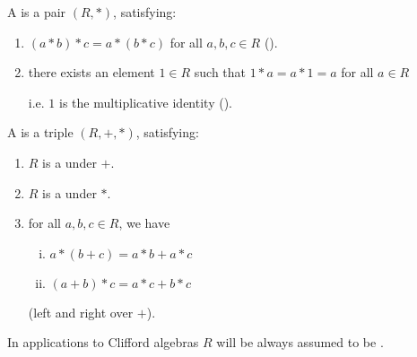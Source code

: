 \begin{definition}[Monoid]
    \label{Monoid}
    \leanok

    A  is a pair $(R, *)$, satisfying:

    \begin{enumerate}
    \item $(a * b) * c = a * (b * c)$ for all $a, b, c \in R$ ().

    \item there exists an element $1 \in R$ such that $1 * a = a * 1 = a$ for all $a \in R$
    
    i.e. $1$ is the multiplicative identity ().

    \end{enumerate}

\end{definition}

\begin{definition}[Ring]
    \label{Ring}
    \leanok

    A  is a triple $(R, +, *)$, satisfying:

    \begin{enumerate}

    \item $R$ is a  under $+$.

    \item $R$ is a  under $*$.

    \item for all $a, b, c \in R$, we have
    
    \begin{enumerate}[(i)]

    \item $a * (b + c) = a * b + a * c$
    \item $(a + b) * c = a * c + b * c$

    \end{enumerate}

    (left and right  over $+$).

    \end{enumerate}

\end{definition}

\begin{remark}
    \label{mk:CommRing}

    In applications to Clifford algebras $R$ will be always assumed to be .
    
\end{remark}


